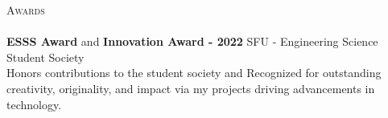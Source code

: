 \documentclass[a4paper]{article}
\newcommand{\lineunder} {
    \vspace*{-8pt} \\
    \hspace*{-18pt} \hrulefill \\
}
\newcommand{\header} [1] {
    {\hspace*{-18pt}\vspace*{6pt} \textsc{#1}}
    \vspace*{-6pt} \lineunder
}
\begin{document}
\header{Awards}
\textbf{ESSS Award} and \textbf{Innovation Award - 2022} \hfill SFU - Engineering Science Student Society\\
Honors contributions to the student society and Recognized for outstanding creativity, originality, and impact via my projects driving advancements in technology.\\
\vspace*{2mm}

\ 
\end{document}
